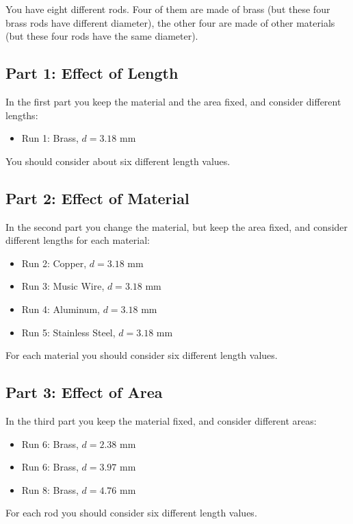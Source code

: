 You have eight different rods. Four of them are made of brass (but these four brass rods have different diameter), the other four are made of other materials (but these four rods have the same diameter).
\subsection{Part 1: Effect of Length}
In the first part you keep the material and the area fixed, and consider different lengths:
\begin{itemize}
	\item Run 1: Brass, $d = 3.18$ mm
\end{itemize}
You should consider about six different length values.
\subsection{Part 2: Effect of Material}
In the second part you change the material, but keep the area fixed, and consider different lengths for each material:
\begin{itemize}
	\item Run 2: Copper, $d = 3.18$ mm
	\item Run 3: Music Wire, $d = 3.18$ mm
	\item Run 4: Aluminum, $d = 3.18$ mm
	\item Run 5: Stainless Steel, $d = 3.18$ mm
\end{itemize}
For each material you should consider six different length values.
\subsection{Part 3: Effect of Area}
In the third part you keep the material fixed, and consider different areas:
\begin{itemize}
	\item Run 6: Brass, $d = 2.38$ mm
	\item Run 6: Brass, $d = 3.97$ mm
	\item Run 8: Brass, $d = 4.76$ mm
\end{itemize}
For each rod you should consider six different length values.
